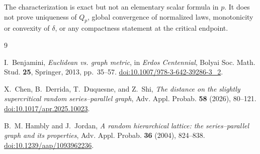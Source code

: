 \documentclass[a4paper,11pt]{amsart}
\theoremstyle{remark}
\begin{document}
The characterization is exact but not an elementary scalar formula in $p$. It does not prove uniqueness of $Q_p$, global convergence of normalized laws, monotonicity or convexity of $\delta$, or any compactness statement at the critical endpoint.

\begin{thebibliography}{9}

I.~Benjamini,
\emph{Euclidean vs. graph metric},
in \emph{Erdos Centennial}, Bolyai Soc. Math. Stud. \textbf{25}, Springer, 2013, pp.~35--57.
\href{https://doi.org/10.1007/978-3-642-39286-3_2}{doi:10.1007/978-3-642-39286-3\_2}.

X.~Chen, B.~Derrida, T.~Duquesne, and Z.~Shi,
\emph{The distance on the slightly supercritical random series--parallel graph},
Adv. Appl. Probab. \textbf{58} (2026), 80--121.
\href{https://doi.org/10.1017/apr.2025.10023}{doi:10.1017/apr.2025.10023}.

B.~M. Hambly and J.~Jordan,
\emph{A random hierarchical lattice: the series--parallel graph and its properties},
Adv. Appl. Probab. \textbf{36} (2004), 824--838.
\href{https://doi.org/10.1239/aap/1093962236}{doi:10.1239/aap/1093962236}.

\end{thebibliography}
\end{document}
